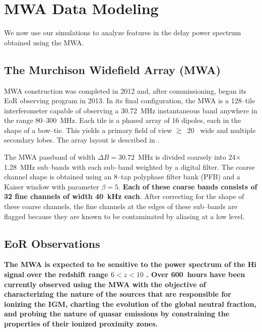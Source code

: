 \documentclass[preprint2,iop,numberedappendix,twocolappendix,appendixfloats]{emulateapj}
\begin{document}
\section{MWA Data Modeling}\label{sec:MWA}

We now use our simulations to analyze features in the delay power spectrum obtained using the MWA.

\subsection{The Murchison Widefield Array (MWA)}\label{sec:instrument}

MWA construction was completed in 2012 and, after commissioning, began its EoR observing program in 2013. In its final configuration, the MWA is a 128--tile interferometer capable of observing a 30.72~MHz instantaneous band anywhere in the range 80--300~MHz. Each tile is a phased array of 16 dipoles, each in the shape of a bow--tie. This yields a primary field of view $\gtrsim$~20\arcdeg~ wide and multiple secondary lobes. The array layout is described in \citet{bea12}. %

The MWA passband of width $\Delta B=30.72$~MHz is divided coarsely into 24$\times$1.28~MHz sub--bands with each sub--band weighted by a digital filter. The coarse channel shape is obtained using an 8--tap polyphase filter bank (PFB) and a Kaiser window with parameter $\beta=5$. {\bf Each of these coarse bands consists of 32 fine channels of width 40~kHz each}. After correcting for the shape of these coarse channels, the fine channels at the edges of these sub--bands are flagged because they are known to be contaminated by aliasing at a low level. %

\subsection{EoR Observations}\label{sec:obsparms}

{\bf The MWA is expected to be sensitive to the power spectrum of the H{\sc i} signal over the redshift range $6<z<10$ \citep{bow06,thy13,bea13}. Over 600~hours have been currently observed using the MWA with the objective of characterizing the nature of the sources that are responsible for ionizing the IGM, charting the evolution of the global neutral fraction, and probing the nature of quasar emissions by constraining the properties of their ionized proximity zones.}
\end{document}
